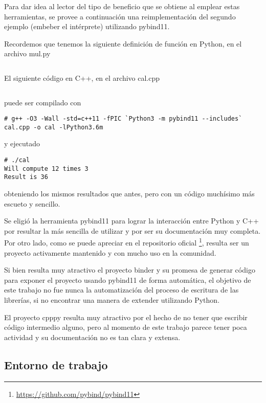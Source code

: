 Para dar idea al lector del tipo de beneficio que se obtiene al emplear estas
herramientas, se provee a continuación una reimplementación del segundo ejemplo
(embeber el intérprete) utilizando pybind11.

Recordemos que tenemos la siguiente definición de función en Python, en el
archivo mul.py

\inputminted{Python}{codelistings/multiply.py}

El siguiente código en C++, en el archivo cal.cpp

\inputminted{c}{codelistings/use_multiply_pybind.c}

puede ser compilado con

\begin{verbatim}
# g++ -O3 -Wall -std=c++11 -fPIC `Python3 -m pybind11 --includes` cal.cpp -o cal -lPython3.6m
\end{verbatim}

y ejecutado

\begin{verbatim}
# ./cal
Will compute 12 times 3
Result is 36
\end{verbatim}

obteniendo los mismos resultados que antes, pero con un código muchísimo más
escueto y sencillo.

Se eligió la herramienta pybind11 para lograr la interacción entre Python y C++
por resultar la más sencilla de utilizar y por ser su documentación muy
completa. Por otro lado, como se puede apreciar en el repositorio oficial
\footnote{\url{https://github.com/pybind/pybind11}}, resulta ser un proyecto
activamente mantenido y con mucho uso en la comunidad.

Si bien resulta muy atractivo el proyecto binder y su promesa de generar
código para exponer el proyecto usando pybind11 de forma automática, el
objetivo de este trabajo no fue nunca la automatización del proceso de
escritura de las librerías, si no encontrar una manera de extender \omnetpp{}
utilizando Python.

El proyecto cpppy resulta muy atractivo por el hecho de no tener que escribir
código intermedio alguno, pero al momento de este trabajo parece tener poca
actividad y su documentación no es tan clara y extensa.

\subsection{Entorno de trabajo}

